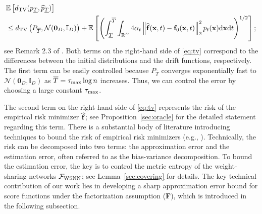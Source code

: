 \documentclass[twoside,11pt]{article}
\def\cF{\mathcal F}
\def\cN{\mathcal N}
\newcommand{\bff}{{\bf f}}
\newcommand{\bF}{{\bf F}}
\newcommand{\bx}{{\bf x}}
\newcommand{\bbE}{{\mathbb E}}
\newcommand{\bbI}{{\mathbb I}}
\newcommand{\bbR}{{\mathbb R}}
\newcommand{\be}{\begin{equation}}
\newcommand{\ee}{\end{equation}}
\def\d{{\rm d}}
\begin{document}
\be \begin{split} \label{eq:tv}
& \bbE\left[   d_{\rm TV} (p_{\underline{T}},  \widehat p_{\underline{T}}) \right]
\\
& \leq d_{\rm TV} \left( P_{\overline{T}}, \cN( \mathbf{0}_{D}, \bbI_{D} ) \right) + \bbE \left[
\left( \int_{\underline{T}}^{\overline{T}} \int_{\bbR^{D}} 4 \alpha_{t} \left\| \widehat \bff (\bx,t) - \bff_0(\bx, t) \right\|_2^2 p_t(\bx) \d \bx \d t \right)^{1/2} \right];
\end{split}\ee
see Remark 2.3 of \citet{bogachev2016distances}.
Both terms on the right-hand side of \eqref{eq:tv} correspond to the differences between the initial distributions and the drift functions, respectively.
The first term can be easily controlled because $P_{\overline{T}}$ converges exponentially fast to $\cN ( \mathbf{0}_{D}, \bbI_{D} )$ as $\overline{T} = \tau_{\rm max} \log n$ increases.
Thus, we can control the error by choosing a large constant $\tau_{\rm max}$.

The second term on the right-hand side of \eqref{eq:tv} represents the risk of the empirical risk minimizer $\widehat\bff$; see Proposition~\ref{sec:oracle} for the detailed statement regarding this term.
There is a substantial body of literature introducing techniques to bound the risk of empirical risk minimizers (e.g., \citealp{van1996weak, geer2000empirical, wainwright2019high}).
Technically, the risk can be decomposed into two terms: the approximation error and the estimation error, often referred to as the bias-variance decomposition.
To bound the estimation error, the key is to control the metric entropy of the weight-sharing networks $\cF_{\rm WSNN}$; see Lemma~\ref{sec:covering} for details.
The key technical contribution of our work lies in developing a sharp approximation error bound
for score functions under the factorization assumption (\bF), which is introduced in the following subsection.
\end{document}
